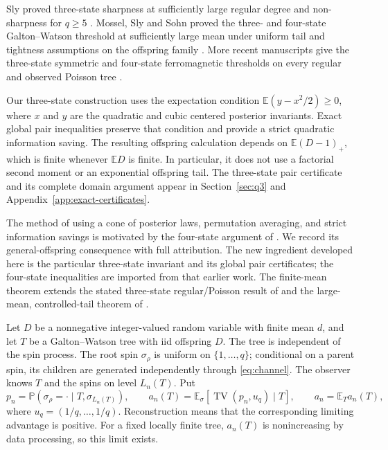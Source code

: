 \documentclass[11pt,reqno]{amsart}
\theoremstyle{definition}
\theoremstyle{remark}
\newcommand{\E}{\mathbb E}
\newcommand{\Prob}{\mathbb P}
\newcommand{\TV}{\operatorname{TV}}
\begin{document}
Sly proved three-state sharpness at sufficiently large regular degree and non-sharpness for $q\ge5$ \cite{Sly2011}. Mossel, Sly and Sohn proved the three- and four-state Galton--Watson threshold at sufficiently large mean under uniform tail and tightness assumptions on the offspring family \cite[Assumptions 1.10--1.11 and Theorem 1.12]{MSS2025}. More recent manuscripts give the three-state symmetric and four-state ferromagnetic thresholds on every regular and observed Poisson tree \cite{OpenAI3,OpenAI4}.

Our three-state construction uses the expectation condition $\E(y-x^2/2)\ge0$, where $x$ and $y$ are the quadratic and cubic centered posterior invariants. Exact global pair inequalities preserve that condition and provide a strict quadratic information saving. The resulting offspring calculation depends on $\E(D-1)_+$, which is finite whenever $\E D$ is finite. In particular, it does not use a factorial second moment or an exponential offspring tail. The three-state pair certificate and its complete domain argument appear in Section~\ref{sec:q3} and Appendix~\ref{app:exact-certificates}.

The method of using a cone of posterior laws, permutation averaging, and strict information savings is motivated by the four-state argument of \cite{OpenAI4}. We record its general-offspring consequence with full attribution. The new ingredient developed here is the particular three-state invariant and its global pair certificates; the four-state inequalities are imported from that earlier work. The finite-mean theorem extends the stated three-state regular/Poisson result of \cite{OpenAI3} and the large-mean, controlled-tail theorem of \cite{MSS2025}.

Let $D$ be a nonnegative integer-valued random variable with finite mean $d$, and let $T$ be a Galton--Watson tree with iid offspring $D$. The tree is independent of the spin process. The root spin $\sigma_\rho$ is uniform on $\{1,\ldots,q\}$; conditional on a parent spin, its children are generated independently through \eqref{eq:channel}. The observer knows $T$ and the spins on level $L_n(T)$. Put
\begin{equation}\label{eq:advantage}
 p_n=\Prob(\sigma_\rho=\cdot\mid T,\sigma_{L_n(T)}),\qquad
 a_n(T)=\E_\sigma[\TV(p_n,u_q)\mid T],\qquad
 a_n=\E_T a_n(T),
\end{equation}
where $u_q=(1/q,\ldots,1/q)$. Reconstruction means that the corresponding limiting advantage is positive. For a fixed locally finite tree, $a_n(T)$ is nonincreasing by data processing, so this limit exists.
\end{document}
